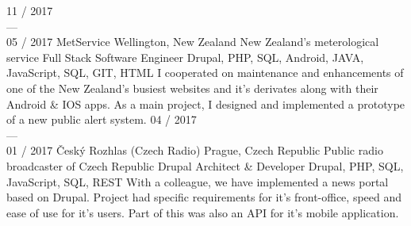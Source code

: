 \documentclass[]{friggeri-cv} %
\begin{document}
\begin{entrylist}
  \job
  {11 / 2017 \\ --- \\ 05 / 2017}
  {MetService}
  {Wellington, New Zealand}
  {New Zealand's meterological service}
  {
  \position
  {Full Stack Software Engineer}
  {Drupal, PHP, SQL, Android, JAVA, JavaScript, SQL, GIT, HTML}
  {
  I cooperated on maintenance and enhancements of one of the New Zealand's busiest websites and it's derivates along with their Android \& IOS apps.
  As a main project, I designed and implemented a prototype of a new public alert system.
  }
  }
  \job
  {04 / 2017 \\ --- \\ 01 / 2017}
  {Český Rozhlas (Czech Radio)}
  {Prague, Czech Republic}
  {Public radio broadcaster of Czech Republic}
  {
    \position
      {Drupal Architect \& Developer}
      {Drupal, PHP, SQL, JavaScript, SQL, REST}
      {
        With a colleague, we have implemented a news portal based on Drupal. Project had specific requirements for
        it's front-office, speed and ease of use for it's users. Part of this was also an API for it's mobile application.
      }%
  }


\end{entrylist}
\end{document}
